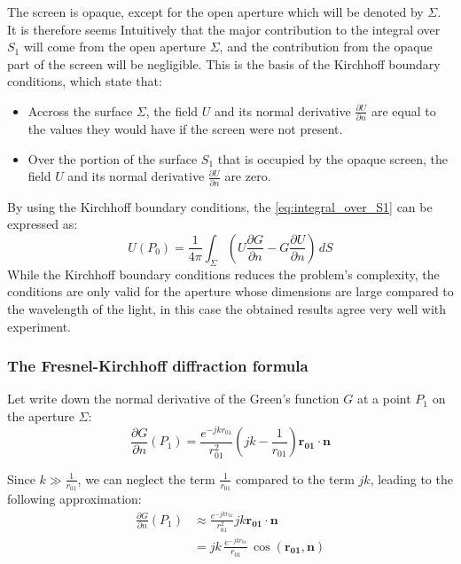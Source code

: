 \documentclass{article}
\begin{document}
The screen is opaque, except for the open aperture which will be denoted by $\Sigma$. It is therefore seems Intuitively that the major contribution to the integral over $S_1$ will come from the open aperture $\Sigma$, and the contribution from the opaque part of the screen will be negligible. This is the basis of the Kirchhoff boundary conditions, which state that:
\begin{itemize}
    \item Accross the surface $\Sigma$, the field $U$ and its normal derivative $\frac{\partial U}{\partial n}$ are equal to the values they would have if the screen were not present.
    \item Over the portion of the surface $S_1$ that is occupied by the opaque screen, the field $U$ and its normal derivative $\frac{\partial U}{\partial n}$ are zero.
\end{itemize}
By using the Kirchhoff boundary conditions, the \cref{eq:integral_over_S1} can be expressed as:
\begin{equation}\label{eq:integral_over_aperture}
    U(P_0) = \frac{1}{4 \pi} \int_{\Sigma} \left( U \frac{\partial G}{\partial n} - G \frac{\partial U}{\partial n} \right) \,dS
\end{equation}
While the Kirchhoff boundary conditions reduces the problem's complexity, the conditions are only valid for the aperture whose dimensions are large compared to the wavelength of the light, in this case the obtained results agree very well with experiment.

\subsubsection{The Fresnel-Kirchhoff diffraction formula}
Let write down the normal derivative of the Green's function $G$ at a point $P_1$ on the aperture $\Sigma$:
\begin{equation}
\frac{\partial G}{\partial n}(P_1)  = \frac{e^{-jk r_{01}}}{r_{01}^2}  \left(jk - \frac{1}{r_{01}}\right) \mathbf{r_{01}} \cdot \mathbf{n} 
\end{equation}

Since $k \gg \frac{1}{r_{01}}$, we can neglect the term $\frac{1}{r_{01}}$ compared to the term $jk$, leading to the following approximation:
\begin{align}
\frac{\partial G}{\partial n} (P_1) &\approx \frac{e^{-jk r_{01}}}{r_{01}^2}  jk \mathbf{r_{01}} \cdot \mathbf{n} \\
&= jk \, \frac{e^{-jk r_{01}}}{r_{01}} \, \cos(\mathbf{r_{01}}, \mathbf{n})
\end{align}
\end{document}
